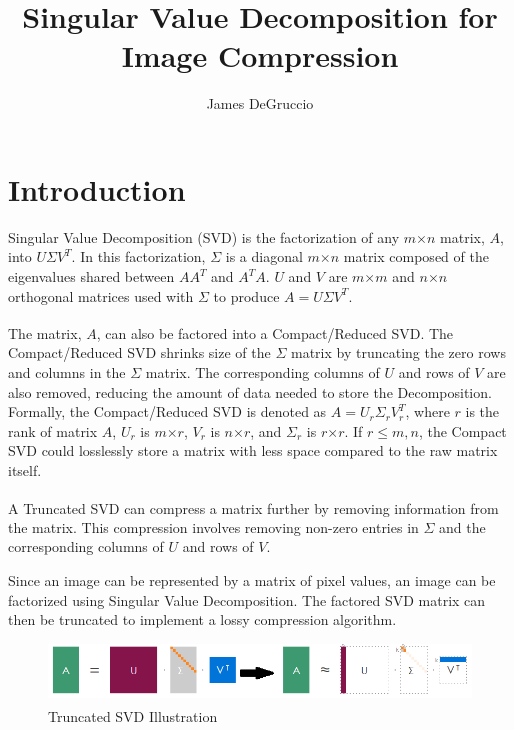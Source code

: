 \documentclass{article}
\title{Singular Value Decomposition for Image Compression}
\author{James DeGruccio}
\begin{document}
\maketitle

\section*{Introduction}

Singular Value Decomposition (SVD) is the factorization of any $m$$\times$$n$ matrix, $A$, into $U$$\Sigma$$V^T$. 
In this factorization, $\Sigma$ is a diagonal $m$$\times$$n$ matrix composed of the eigenvalues shared between $A$$A^T$ and $A^T$$A$.
$U$ and $V$ are $m$$\times$$m$ and $n$$\times$$n$ orthogonal matrices used with $\Sigma$ to produce $A = U \Sigma V^T$.

The matrix, $A$, can also be factored into a Compact/Reduced SVD\textsuperscript{\cite{compsvd}}.
The Compact/Reduced SVD shrinks size of the $\Sigma$ matrix by truncating the zero rows and columns in the $\Sigma$ matrix. 
The corresponding columns of $U$ and rows of $V$ are also removed, reducing the amount of data needed to store the Decomposition.
Formally, the Compact/Reduced SVD is denoted as $A = U_r \Sigma _r V_r^T$, where $r$ is the rank of matrix $A$, $U_r$ is $m$$\times$$r$, $V_r$ is $n$$\times$$r$, and $\Sigma_r$ is $r$$\times$$r$.
If $r \leq m, n$, the Compact SVD could losslessly store a matrix with less space compared to the raw matrix itself. 

A Truncated SVD\textsuperscript{\cite{compsvd}} can compress a matrix further by removing information from the matrix. 
This compression involves removing non-zero entries in $\Sigma$ and the corresponding columns of $U$ and rows of $V$. 

Since an image can be represented by a matrix of pixel values, an image can be factorized using Singular Value Decomposition.
The factored SVD matrix can then be truncated to implement a lossy compression algorithm. 

\begin{figure}[h]
    \includegraphics{Truncated-SVD.png}
    \centering
    \caption{Truncated SVD Illustration\textsuperscript{\cite{tsvd}}}
\end{figure}

\newpage
\end{document}
